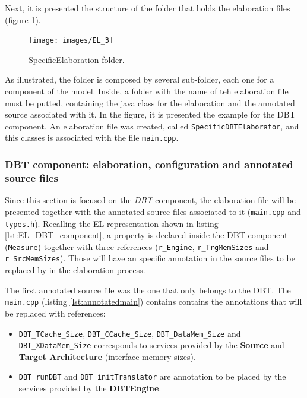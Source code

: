 \documentclass[12pt]{article}
\begin{document}
{Next, it is presented the structure of the folder that holds the elaboration files (figure \ref{fig:el_3}). 

\begin{figure}[H]
\centerline{
\texttt{[image: images/EL\_3]}
}
\caption{SpecificElaboration folder.}
\label{fig:el_3} 
\end{figure}

As illustrated, the folder is composed by several sub-folder, each one for a component of the model. Inside, a folder with the name of teh elaboration file must be putted, containing the java class for the elaboration and the annotated source associated with it. In the figure, it is presented the example for the DBT component. An elaboration file was created, called \texttt{SpecificDBTElaborator}, and this classes is associated with the file \texttt{main.cpp}.


\subsubsection{DBT component: elaboration, configuration and annotated source files}

Since this section is focused on the \textit{DBT} component, the elaboration file will be presented together with the annotated source files associated to it (\texttt{main.cpp} and \texttt{types.h}). Recalling the EL representation shown in listing \ref{lst:EL_DBT_component}, a property is declared inside the DBT component (\texttt{Measure}) together with three references (\texttt{r\_Engine}, \texttt{r\_TrgMemSizes} and \texttt{r\_SrcMemSizes}). Those will have an specific annotation in the source files to be replaced by in the elaboration process.

The first annotated source file was the one that only belongs to the DBT. The \texttt{main.cpp} (listing \ref{lst:annotatedmain}) contains contains the annotations that will be replaced with references:
\begin{itemize}
\item  \texttt{DBT\_TCache\_Size}, \texttt{DBT\_CCache\_Size},  \texttt{DBT\_DataMem\_Size} and \texttt{DBT\_XDataMem\_Size} corresponds to services provided by the \textbf{Source} and \textbf{Target Architecture} (interface memory sizes).
\item \texttt{DBT\_runDBT} and \texttt{DBT\_initTranslator} are annotation to be placed by the services provided by the \textbf{DBTEngine}.
\end{itemize}

}
\end{document}
